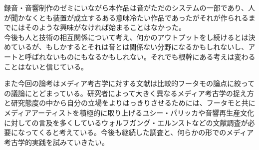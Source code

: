 \documentclass[a4paper,report]{jsbook}
\begin{document}
録音・音響制作のゼミにいながら本作品は音がただのシステムの一部であり、人が聞かなくとも装置が成立するある意味冷たい作品であったがそれが作られるまでにはそのような興味がなければ始まることはなかった。\\
今後も人と技術の相互関係について考え、何かのアウトプットをし続けるとは決めているが、もしかするとそれは音とは関係ない分野になるかもしれないし、アートと呼ばれないものにもなるかもしれない。それでも根幹にある考えは変わることはないと信じている。

また今回の論考はメディア考古学に対する文献は比較的フータモの論点に絞っての議論にとどまっている。研究者によって大きく異なるメディア考古学の捉え方と研究態度の中から自分の立場をよりはっきりさせるためには、フータモと共にメディアアーティストを積極的に取り上げるユシー・パリッカや音響再生産文化に対しての言及を多くしているウォルフガング・エルンストなどの文献調査が必要になってくると考えている。今後も継続した調査と、何らかの形でのメディア考古学的実践を試みていきたい。


\printbibliography[title = 参考文献]
\end{document}

